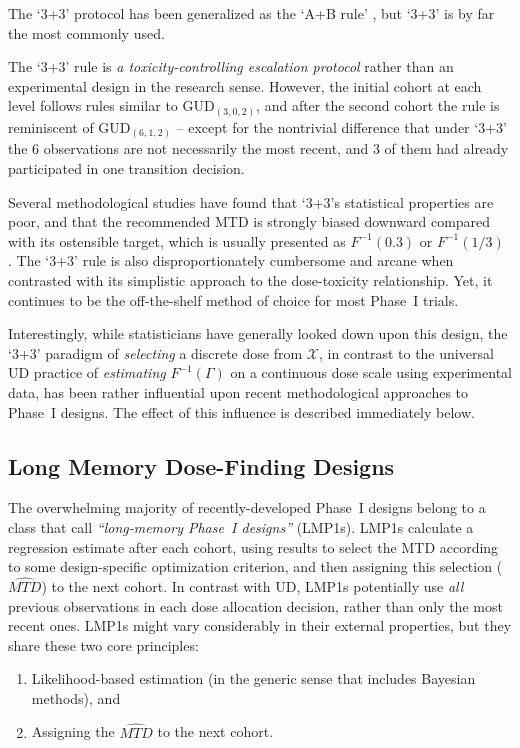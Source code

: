 \noindent The `3+3' protocol has been generalized as the `A+B rule' \citep{Lin:Shih:stat:2001}, but `3+3' is by far the most commonly used.

The `3+3' rule is \emph{a toxicity-controlling escalation protocol} rather than an experimental design in the research sense. However, the initial cohort at each level follows rules similar to GUD$_{(3,0,2)}$, and after the second cohort the rule is reminiscent of GUD$_{(6,1,2)}$ -- except for the nontrivial difference that under `3+3' the 6 observations are not necessarily the most recent, and 3 of them had already participated in one transition decision.

Several methodological studies have found that `3+3's statistical properties are poor, and that the recommended MTD is strongly biased downward compared with its ostensible target, which is usually presented as $F^{-1}(0.3)$ or $F^{-1}(1/3)$ \citep{Rein:Paol:O'Qu:oper:1999,Lin:Shih:stat:2001}. The `3+3' rule is also disproportionately cumbersome and arcane when contrasted with its simplistic approach to the dose-toxicity relationship. Yet, it continues to be the off-the-shelf method of choice for most Phase~I trials.

Interestingly, while statisticians have generally looked down upon this design, the `3+3' paradigm of \emph{selecting} a discrete dose from $\mathcal{X}$, in contrast to the universal UD practice of \emph{estimating} $F^{-1}(\Gamma)$ on a continuous dose scale using experimental data, has been rather influential upon recent methodological approaches to Phase~I designs. The effect of this influence is described immediately below.

\subsection{Long Memory Dose-Finding Designs}

The overwhelming majority of recently-developed Phase~I designs belong to a class that \cite{Oron:Hoff:smal:2013} call \emph{``long-memory Phase~I designs''} (LMP1s). LMP1s calculate a regression estimate after each cohort, using results to select the MTD according to some design-specific optimization criterion, and then assigning this selection ($\widehat{MTD}$) to the next cohort. In contrast with UD, LMP1s potentially use \emph{all} previous observations in each dose allocation decision, rather than only the most recent ones. LMP1s might vary considerably in their external properties, but they share these two core principles:
\begin{enumerate}
\item Likelihood-based estimation (in the generic sense that includes Bayesian methods), and
\item Assigning the $\widehat{MTD}$ to the next cohort.
\end{enumerate}

